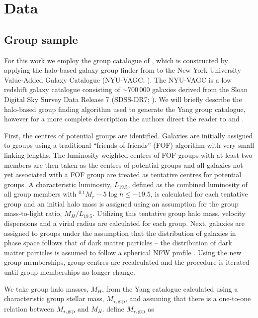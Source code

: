 \documentclass[a4paper,fleqn,usenatbib]{mnras}
\begin{document}

\section{Data}
\label{sec:data}

\subsection{Group sample}
\label{sec:data_group}

For this work we employ the group catalogue of \citet{yang2007}, which
is constructed by applying the halo-based galaxy group finder from
\citet{yang2005, yang2007} to the New York University Value-Added
Galaxy Catalogue (NYU-VAGC; \citealt{blanton2005}).  The NYU-VAGC is a
low redshift galaxy catalogue consisting of
$\sim\!700\,000$ galaxies derived from the Sloan Digital Sky Survey
Data Release
7 (SDSS-DR7; \citealt{abazajian2009}).  We will briefly describe the
halo-based group finding algorithm used to generate the Yang group catalogue,
however for a more complete description the authors direct the reader
to \citet{yang2005} and \citet{yang2007}.
\par
First, the centres of potential groups are identified.  Galaxies are
initially assigned to groups using a traditional
``friends-of-friends'' (FOF) algorithm \citep[e.g.][]{huchra1982} with
very small linking lengths.  The luminosity-weighted centres of
FOF groups with at least two members are then taken as the centres of
potential groups and all galaxies not yet associated with a FOF group
are treated as tentative centres for potential groups.  A
characteristic luminosity, $L_{19.5}$, defined as the combined
luminosity of all group members with $^{0.1}M_r - 5\log h \le -19.5$,
is calculated for each tentative group and an initial halo mass is
assigned using an assumption for the group mass-to-light ratio,
$M_H/L_{19.5}$.  Utilizing this tentative group halo mass, velocity
dispersions and a virial radius are calculated for each group.  Next,
galaxies are assigned to groups under the assumption that the
distribution of galaxies in phase space follows that of dark matter
particles -- the distribution of dark matter particles is assumed to
follow a spherical NFW profile \citep{navarro1997}.  Using the new
group memberships, group centres are recalculated and the procedure is
iterated until group memberships no longer change.
\par
We take group halo masses, $M_H$, from the Yang catalogue calculated
using a characteristic group stellar mass, $M_{\star,\text{grp}}$, and
assuming that there is a one-to-one relation between $M_{\star,\text{grp}}$
and $M_H$.  \citet{yang2007} define $M_{\star,\text{grp}}$ as
\end{document}

